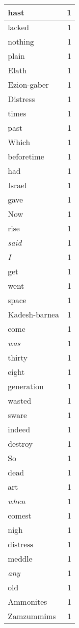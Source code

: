 \begin{center}
\begin{longtable}{l|r}
hast & 1 \\ \hline
lacked & 1 \\ \hline
nothing & 1 \\ \hline
plain & 1 \\ \hline
Elath & 1 \\ \hline
Ezion-gaber & 1 \\ \hline
Distress & 1 \\ \hline
times & 1 \\ \hline
past & 1 \\ \hline
Which & 1 \\ \hline
beforetime & 1 \\ \hline
had & 1 \\ \hline
Israel & 1 \\ \hline
gave & 1 \\ \hline
Now & 1 \\ \hline
rise & 1 \\ \hline
\emph{said} & 1 \\ \hline
\emph{I} & 1 \\ \hline
get & 1 \\ \hline
went & 1 \\ \hline
space & 1 \\ \hline
Kadesh-barnea & 1 \\ \hline
come & 1 \\ \hline
\emph{was} & 1 \\ \hline
thirty & 1 \\ \hline
eight & 1 \\ \hline
generation & 1 \\ \hline
wasted & 1 \\ \hline
sware & 1 \\ \hline
indeed & 1 \\ \hline
destroy & 1 \\ \hline
So & 1 \\ \hline
dead & 1 \\ \hline
art & 1 \\ \hline
\emph{when} & 1 \\ \hline
comest & 1 \\ \hline
nigh & 1 \\ \hline
distress & 1 \\ \hline
meddle & 1 \\ \hline
\emph{any} & 1 \\ \hline
old & 1 \\ \hline
Ammonites & 1 \\ \hline
Zamzummims & 1 \\ \hline

\end{longtable}
\end{center}
